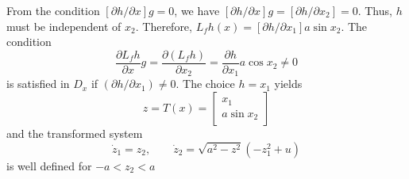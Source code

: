 \documentclass[12pt,a4paper,oneside]{book}
\begin{document}
\begin{onehalfspace}
\begin{example}
From the condition $[\partial h/\partial x]g=0$, we have $[\partial h/\partial x]g=[\partial h/\partial x_2]=0$. Thus, $h$ must be independent of $x_2$. Therefore, $L_fh(x)=[\partial h/\partial x_1]a\sin x_2$. The condition
\begin{equation*}
	\frac{\partial L_fh}{\partial x}g=\frac{\partial (L_fh)}{\partial x_2}=\frac{\partial h}{\partial x_1}a\cos x_2\ne0
\end{equation*}
is satisfied in $D_x$ if $(\partial h/\partial x_1)\ne0$. The choice $h=x_1$ yields
\begin{equation}
	z = T(x) = \begin{bmatrix} x_1 \\[6pt] a\sin x_2 \end{bmatrix}
\end{equation}
and the transformed system
\begin{equation}
	\dot{z}_1=z_2,\qquad\dot{z}_2=\sqrt{a^2-z^2}(-z_1^2+u)	
\end{equation}
			is well defined for $-a<z_2<a$
			

\end{example}
\end{onehalfspace}
\end{document}
